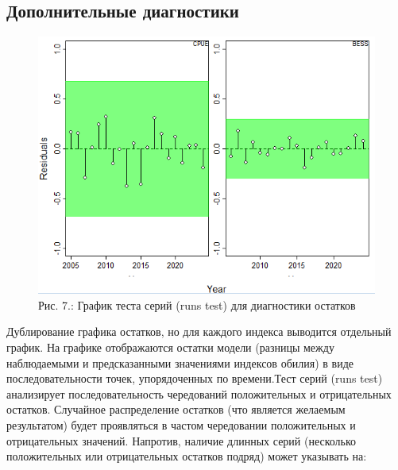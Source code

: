 \documentclass[
  letterpaper,
  DIV=11,
  numbers=noendperiod]{scrreprt}
\newenvironment{Shaded}{\begin{snugshade}}{\end{snugshade}}
\newcommand{\AttributeTok}[1]{\textcolor[rgb]{0.40,0.45,0.13}{#1}}
\newcommand{\CommentTok}[1]{\textcolor[rgb]{0.37,0.37,0.37}{#1}}
\newcommand{\ConstantTok}[1]{\textcolor[rgb]{0.56,0.35,0.01}{#1}}
\newcommand{\FunctionTok}[1]{\textcolor[rgb]{0.28,0.35,0.67}{#1}}
\newcommand{\NormalTok}[1]{\textcolor[rgb]{0.00,0.23,0.31}{#1}}
\newcommand{\SpecialCharTok}[1]{\textcolor[rgb]{0.37,0.37,0.37}{#1}}
\newcommand{\StringTok}[1]{\textcolor[rgb]{0.13,0.47,0.30}{#1}}
\begin{document}
\subsection{Дополнительные
диагностики}\label{ux434ux43eux43fux43eux43bux43dux438ux442ux435ux43bux44cux43dux44bux435-ux434ux438ux430ux433ux43dux43eux441ux442ux438ux43aux438}

\begin{Shaded}
\end{Shaded}

\begin{figure}[H]

{\centering \includegraphics[width=0.6\linewidth,height=\textheight,keepaspectratio]{images/JABBA7.PNG}

}

\caption{Рис. 7.: График теста серий (runs test) для диагностики
остатков}

\end{figure}%

Дублирование графика остатков, но для каждого индекса выводится
отдельный график. На графике отображаются остатки модели (разницы между
наблюдаемыми и предсказанными значениями индексов обилия) в виде
последовательности точек, упорядоченных по времени.Тест серий (runs
test) анализирует последовательность чередований положительных и
отрицательных остатков. Случайное распределение остатков (что является
желаемым результатом) будет проявляться в частом чередовании
положительных и отрицательных значений. Напротив, наличие длинных серий
(несколько положительных или отрицательных остатков подряд) может
указывать на:
\end{document}
